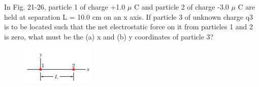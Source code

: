 \documentclass[11pt]{exam}
\begin{document}
\begin{questions}
\addpoints
\question[10] In Fig. 21-26, particle 1 of charge +1.0 $\mu$ C and particle  2 of charge -3.0 $\mu$ C are held at separation L = 10.0 cm on an x axis. If particle 3 of unknown charge q3 is to be located such that the net electrostatic force on it from particles 1 and 2 is zero, what must be the (a) x and (b) y coordinates of particle 3?\begin{figure}[H]
\centering
\includegraphics[scale=0.8]{assets/Halliday_ch21p13.png}
\end{figure}
\newpage





\end{questions}
\end{document}
